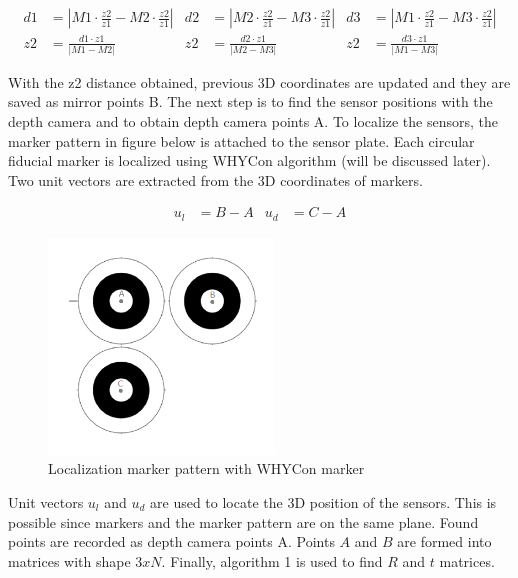 \begin{align*}
    d1 & = |M1 \cdot \frac{z2}{z1} - M2 \cdot \frac{z2}{z1} | & d2 & = |M2 \cdot \frac{z2}{z1} - M3 \cdot \frac{z2}{z1} | & d3 & = |M1 \cdot \frac{z2}{z1} - M3 \cdot \frac{z2}{z1} | \\
    z2 & =  \frac{d1 \cdot z1}{|M1 - M2|}                     & z2 & =  \frac{d2 \cdot z1}{|M2 - M3|}                     & z2 & =  \frac{d3 \cdot z1}{|M1 - M3|}
\end{align*}




With the z2 distance obtained, previous 3D coordinates are
updated and they are saved as mirror points B.
The next step is to find the sensor positions with the depth
camera and to obtain depth camera points A. To localize the
sensors, the marker pattern in figure below is attached to
the sensor plate. Each circular fiducial marker is localized
using WHYCon algorithm (will be discussed later). Two unit
vectors are extracted from the 3D coordinates of markers.


\begin{align*}
    u_{l} & = B-A & u_{d} & = C-A
\end{align*}



\begin{figure}[!htb]\centering
    \includegraphics*[width = 6cm]{bilder/project/localization_marker_1.png}
    \caption{Localization marker pattern with WHYCon marker}
    \label{fig:whycon localization marker}
\end{figure}



Unit vectors $u_{l}$ and $u_{d}$ are used to locate the 3D position of
the sensors. This is possible since markers and the marker pattern are
on the same plane. Found points are recorded as depth camera points A.
Points $A$ and $B$ are formed into matrices with shape $3xN$. Finally, algorithm
1 is used to find $R$ and $t$ matrices.


